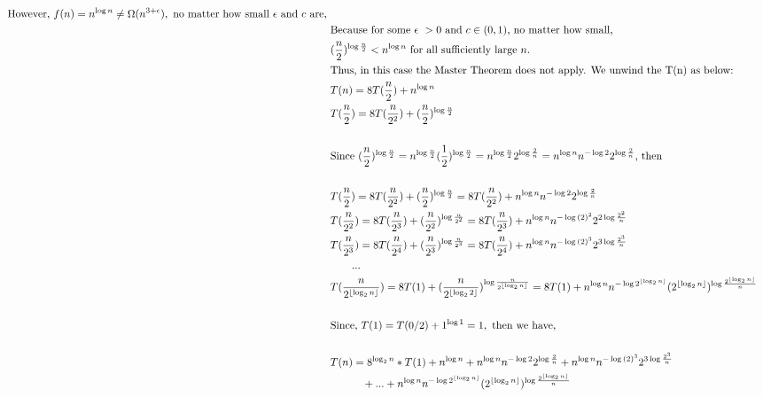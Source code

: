 \documentclass[a4paper]{scrartcl}
\begin{document}
\begin{enumerate}[label=(\alph*)]
\begin{align*}
   \text{However, }f(n)=n^{\log{n}}\neq \Omega(n^{3+\epsilon}),\text{ no matter how small }\epsilon\text{ and }c\text{ are,}\\ &\
   \text{Because for some }\epsilon\ >0\text{ and }c\in (0, 1)\text{, no matter how small, }\\&\
   (\frac{n}{2})^{\log{\frac{n}{2}}}< n^{\log{n}}\text{ for all sufficiently large }n.\\ &\
   \text{Thus, in this case the Master Theorem does not apply. We unwind the T(n) as below:}\\ &\
   T(n) = 8T(\frac{n}{2})+n^{\log{n}}\\ &\
   T(\frac{n}{2})
   =8T(\frac{n}{2^2})+(\frac{n}{2})^{\log{\frac{n}{2}}}\\ &\
   \\ &\
   \text{Since }(\frac{n}{2})^{\log{\frac{n}{2}}}  =n^{\log{\frac{n}{2}}}(\frac{1}{2})^{\log{\frac{n}{2}}}
   =n^{\log{\frac{n}{2}}}2^{\log{\frac{2}{n}}}
   =n^{\log{n}}n^{-\log{2}}2^{\log{\frac{2}{n}}}\text{, then}\\ &\
   \\ &\
   T(\frac{n}{2})
   =8T(\frac{n}{2^2})+(\frac{n}{2})^{\log{\frac{n}{2}}}
   =8T(\frac{n}{2^2})+n^{\log{n}}n^{-\log{2}}2^{\log{\frac{2}{n}}}
   \\ &\
   T(\frac{n}{2^2})
   =8T(\frac{n}{2^3})+(\frac{n}{2^2})^{\log{\frac{n}{2^2}}}
   =8T(\frac{n}{2^3})+n^{\log{n}}n^{-\log{(2)^2}}2^{2\log{\frac{2^2}{n}}}
   \\ &\
   T(\frac{n}{2^3})
   =8T(\frac{n}{2^4})+(\frac{n}{2^3})^{\log{\frac{n}{2^3}}}
   =8T(\frac{n}{2^4})+n^{\log{n}}n^{-\log{(2)^3}}2^{3\log{\frac{2^3}{n}}}
   \\ &\
   \qquad ...\\ &\
   T(\frac{n}{2^{\floor{\log_2{n}}}})= 8T(1)+(\frac{n}{2^{\floor{\log_2{2}}}})^{\log{\frac{n}{2^{\floor{\log_2{n}}}}}}          
    =8T(1)+n^{\log{n}}n^{-\log{2^{\floor{\log_2{n}}}}}(2^{\floor{\log_2{n}}})^{\log{\frac{2^{\floor{\log_2{n}}}}{n}}}
   \\ &\
   \\ &\
   \text{Since, }T(1)=T(0/2)+1^{\log{1}}=1,\text{ then we have,}\\ &\
   \\ &\
   T(n)=
   8^{\log_2{n}}*T(1)+ n^{\log{n}} 
   +n^{\log{n}}n^{-\log{2}}2^{\log{\frac{2}{n}}}+n^{\log{n}}n^{-\log{(2)^3}}2^{3\log{\frac{2^3}{n}}}\\ &\
   \qquad\quad+...+n^{\log{n}}n^{-\log{2^{\floor{\log_2{n}}}}}(2^{\floor{\log_2{n}}})^{\log{\frac{2^{\floor{\log_2{n}}}}{n}}}\\ &\

\end{align*}
\end{enumerate}
\end{document}

